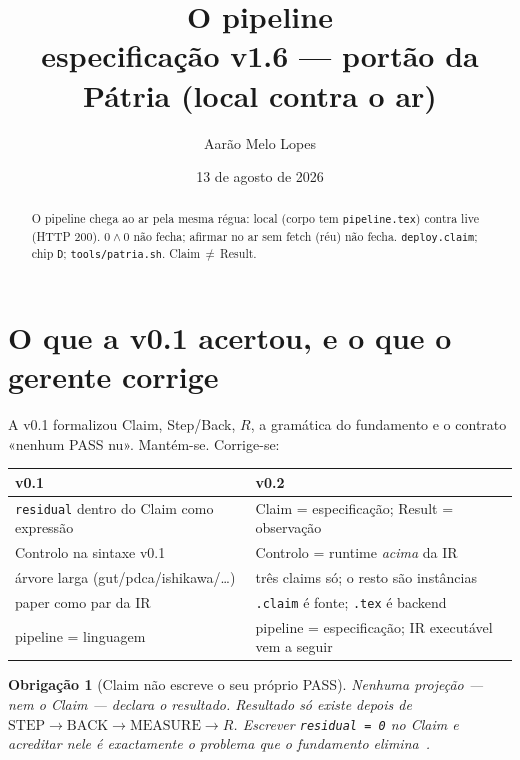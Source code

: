 \documentclass[11pt,a4paper]{article}
\title{\textbf{O pipeline}\\[3pt]
  {\large especificação v1.6 --- portão da Pátria (local contra o ar)}}
\author{Aarão Melo Lopes}
\date{13 de agosto de 2026}
\newcommand{\code}[1]{\texttt{\small #1}}
\newtheorem{obrigacao}[teorema]{Obrigação}
\begin{document}
\maketitle

\begin{abstract}
\noindent O pipeline chega ao ar pela mesma régua: local (corpo tem
\code{pipeline.tex}) contra live (HTTP 200). $0\wedge0$ não fecha;
afirmar no ar sem fetch (réu) não fecha.
\code{deploy.claim}; chip \code{D}; \code{tools/patria.sh}.
Claim\,$\neq$\,Result.
\end{abstract}

\tableofcontents

\section{O que a v0.1 acertou, e o que o gerente corrige}\label{sec:v01-v02}

A v0.1 formalizou \textsf{Claim}, \textsf{Step}/\textsf{Back}, $R$, a gramática
do fundamento e o contrato «nenhum PASS nu». Mantém-se. Corrige-se:

\begin{center}\small
\begin{tabular}{@{}p{5.2cm}p{7.0cm}@{}}
\toprule
v0.1 & v0.2 \\
\midrule
\code{residual} dentro do Claim como expressão & Claim = especificação; Result = observação \\
Controlo na sintaxe v0.1 & Controlo = runtime \emph{acima} da IR \\
árvore larga (gut/pdca/ishikawa/\ldots) & três claims só; o resto são instâncias \\
paper como par da IR & \code{*.claim} é fonte; \code{.tex} é backend \\
pipeline = linguagem & pipeline = especificação; IR executável vem a seguir \\
\bottomrule
\end{tabular}
\end{center}

\begin{obrigacao}[Claim não escreve o seu próprio PASS]\label{ob:claim-result}
Nenhuma projeção --- nem o Claim --- declara o resultado. Resultado só existe
depois de $\mathrm{STEP}\to\mathrm{BACK}\to\mathrm{MEASURE}\to R$. Escrever
\code{residual = 0} no Claim e acreditar nele é exactamente o problema que o
fundamento elimina~\cite{fundamento}.
\end{obrigacao}
\end{document}

